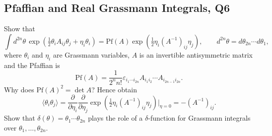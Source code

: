 \subsection{Pfaffian and Real Grassmann Integrals, Q6}

Show that
\begin{equation}
    \int d^{2n}\theta\,\exp\!\left(\tfrac{1}{2}\theta_i A_{ij}\theta_j + \eta_i\theta_i\right) = \mathrm{Pf}(A)\exp\!\left(\tfrac{1}{2}\eta_i(A^{-1})_{ij}\eta_j\right), \qquad d^{2n}\theta = d\theta_{2n}\cdots d\theta_1,
\end{equation}
where $\theta_i$ and $\eta_i$ are Grassmann variables, $A$ is an invertible antisymmetric matrix and the Pfaffian is
\begin{equation}
    \mathrm{Pf}(A) = \frac{1}{2^n n!}\varepsilon_{i_1\cdots i_{2n}}A_{i_1 i_2}\cdots A_{i_{2n-1}i_{2n}}.
\end{equation}
Why does $\mathrm{Pf}(A)^2 = \det A$? Hence obtain
\begin{equation}
    \langle\theta_i\theta_j\rangle = \frac{\partial}{\partial\eta_i}\frac{\partial}{\partial\eta_j}\exp\!\left(\tfrac{1}{2}\eta_i(A^{-1})_{ij}\eta_j\right)\bigg|_{\eta=0} = -(A^{-1})_{ij}.
\end{equation}
Show that $\delta(\theta) = \theta_1\cdots\theta_{2n}$ plays the role of a $\delta$-function for Grassmann integrals over $\theta_1,\ldots,\theta_{2n}$.

